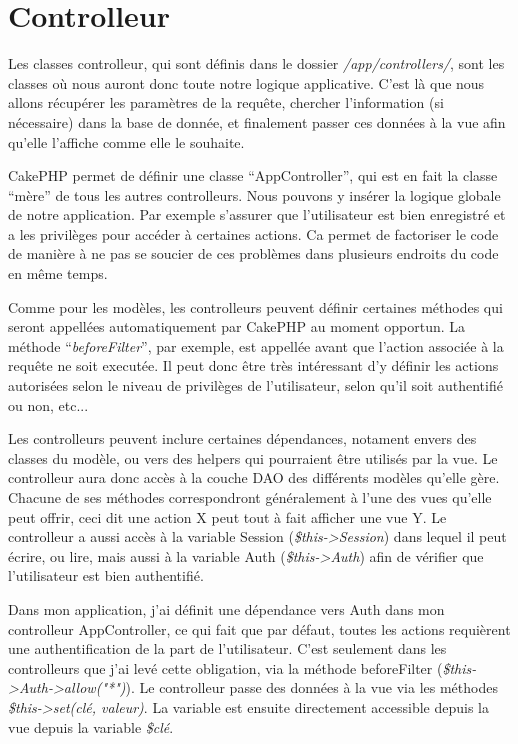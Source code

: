 \documentclass[12pt]{article}
\begin{document}
  \section{Controlleur}
    Les classes controlleur, qui sont définis dans le dossier \emph{/app/controllers/}, sont les classes où nous auront donc toute notre logique applicative. C'est là que nous allons récupérer les paramètres de la requête, chercher l'information (si nécessaire) dans la base de donnée, et finalement passer ces données à la vue afin qu'elle l'affiche comme elle le souhaite.
    
CakePHP permet de définir une classe “AppController”, qui est en fait la classe “mère” de tous les autres controlleurs. Nous pouvons y insérer la logique globale de notre application. Par exemple s'assurer que l'utilisateur est bien enregistré et a les privilèges pour accéder à certaines actions. Ca permet de factoriser le code de manière à ne pas se soucier de ces problèmes dans plusieurs endroits du code en même temps.

Comme pour les modèles, les controlleurs peuvent définir certaines méthodes qui seront appellées automatiquement par CakePHP au moment opportun. La méthode ``\emph{beforeFilter}'', par exemple, est appellée avant que l'action associée à la requête ne soit executée. Il peut donc être très intéressant d'y définir les actions autorisées selon le niveau de privilèges de l'utilisateur, selon qu'il soit authentifié ou non, etc...

Les controlleurs peuvent inclure certaines dépendances, notament envers des classes du modèle, ou vers des helpers qui pourraient être utilisés par la vue. Le controlleur aura donc accès à la couche DAO des différents modèles qu'elle gère. Chacune de ses méthodes correspondront généralement à l'une des vues qu'elle peut offrir, ceci dit une action X peut tout à fait afficher une vue Y.
Le controlleur a aussi accès à la variable Session (\emph{\$this->Session}) dans lequel il peut écrire, ou lire, mais aussi à la variable Auth (\emph{\$this->Auth}) afin de vérifier que l'utilisateur est bien authentifié. 

Dans mon application, j'ai définit une dépendance vers Auth dans mon controlleur AppController, ce qui fait que par défaut, toutes les actions requièrent une authentification de la part de l'utilisateur. C'est seulement dans les controlleurs que j'ai levé cette obligation, via la méthode beforeFilter (\emph{\$this->Auth->allow("*")}). 
Le controlleur passe des données à la vue via les méthodes \emph{\$this->set(clé, valeur)}. La variable est ensuite directement accessible depuis la vue depuis la variable \emph{\$clé}.
\end{document}
